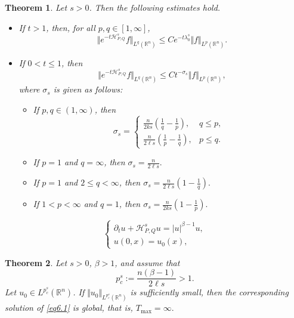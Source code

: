 \documentclass[10pt,a4paper]{amsart}
\newtheorem{theorem}{Theorem}
\newcommand{\APQ}{\mathcal{H}_{P, Q}}
\begin{document}
\begin{theorem}
\label{Lpmapping}
Let $s>0$. Then the following estimates hold.

\begin{itemize}
\item If $t>1$, then, for all $p,q\in[1,\infty]$,
\begin{equation}
\label{lpest}
    \Vert e^{-t\APQ^s}f\Vert_{L^q(\mathbb R^n)}
    \leq
    C e^{-t\lambda_0^s}
    \Vert f\Vert_{L^p(\mathbb R^n)}.
\end{equation}

\item If $0<t\leq1$, then
\begin{equation}
\label{lpest1}
    \Vert e^{-t\APQ^s}f\Vert_{L^q(\mathbb R^n)}
    \leq
    C t^{-\sigma_s}
    \Vert f\Vert_{L^p(\mathbb R^n)},
\end{equation}
where $\sigma_s$ is given as follows:
\begin{itemize}
\item[(i)] If $p,q\in(1,\infty)$, then
\[
    \sigma_s=
    \begin{cases}
    \displaystyle
    \frac{n}{2k s}
    \left(\frac1q-\frac1p\right),
    & q\leq p,\\[3mm]
    \displaystyle
    \frac{n}{2\ell s}
    \left(\frac1p-\frac1q\right),
    & p\leq q.
    \end{cases}
\]

\item[(ii)] If $p=1$ and $q=\infty$, then $ \sigma_s=\frac{n}{2\ell s}.$

\item[(iii)] If $p=1$ and $2\leq q<\infty$, then $ \sigma_s=
    \frac{n}{2\ell s}
    \left(1-\frac1q\right).$

\item[(iv)] If $1<p<\infty$ and $q=1$, then $ \sigma_s=
    \frac{n}{2k s}
    \left(1-\frac1p\right).$
\end{itemize}
\end{itemize}
\end{theorem}

\begin{equation}
\label{eq6.1}
    \begin{cases}
        \partial_t u+\APQ^s u=|u|^{\beta-1}u,\\
        u(0,x)=u_0(x),
    \end{cases}
\end{equation}

\begin{theorem}
\label{criticalglobal}
Let $s>0$, $\beta>1$, and assume that
\[
    p_c^s:=\frac{n(\beta-1)}{2\ell s}>1.
\]
Let $u_0\in L^{p_c^s}(\mathbb R^n)$. If $\Vert u_0\Vert_{L^{p_c^s}(\mathbb R^n)}$
is sufficiently small, then the corresponding solution of \eqref{eq6.1} is global, that is, $T_{\max}=\infty.$
\end{theorem}
\end{document}

